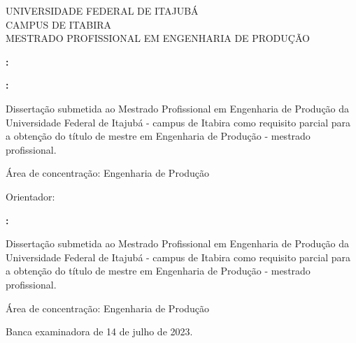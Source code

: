     \onehalfspacing \begin{center}
        
        UNIVERSIDADE FEDERAL DE ITAJUBÁ\\
        CAMPUS DE ITABIRA \\
        MESTRADO PROFISSIONAL EM ENGENHARIA DE PRODUÇÃO 

    \end{center}
    \vspace{5cm}
    \center \AuthorName
    \vspace{5cm}
    \center \Title \textbf{:} \Subtitle
    \null\vfil
    \center \Location
    \center \Year
    \pagestyle{empty}
    \pagebreak

    \center \AuthorName
    \vspace{9cm}
    \center \Title \textbf{:} \Subtitle

    \vspace{4cm}
    \begin{changemargin}{8cm}{0cm} 
        \begin{fontsize}{10}{12} \selectfont
            Dissertação submetida ao Mestrado Profissional em Engenharia de Produção da Universidade Federal de Itajubá - campus de Itabira como requisito parcial para a obtenção do título de mestre em Engenharia de Produção - mestrado profissional. 
            
            Área de concentração: Engenharia de Produção

            Orientador: \Supervisor
        \end{fontsize}
    \end{changemargin}
    \null\vfil
    \center \Location
    \center \Year
    \pagebreak

    \center \AuthorName
    \vspace{5cm}
    \center \Title \textbf{:} \Subtitle

    \vspace{4cm}
    \begin{changemargin}{8cm}{0cm} 
        \begin{fontsize}{10}{12} \selectfont
            Dissertação submetida ao Mestrado Profissional em Engenharia de Produção da Universidade Federal de Itajubá - campus de Itabira como requisito parcial para a obtenção do título de mestre em Engenharia de Produção - mestrado profissional. 
            
            Área de concentração: Engenharia de Produção

            Banca examinadora de 14 de julho de 2023.
            
        \end{fontsize}
    \end{changemargin}

